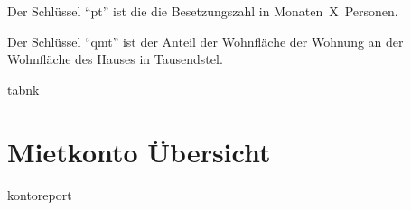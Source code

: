 \documentclass[12pt]{article}
\begin{document}
Der Schlüssel ``pt'' ist die die Besetzungszahl in Monaten\  X\  Personen.

Der Schlüssel ``qmt'' ist der Anteil der Wohnfläche der Wohnung an 
der Wohnfläche des Hauses in Tausendstel.



\bigskip
\bigskip
\bigskip
\bigskip


{
\begin{centering}
{{ tabnk }}
\end{centering}
}

\vfill\eject

\section*{Mietkonto Übersicht}
{\small
\begin{centering}
{{ kontoreport }}
\end{centering}
}
\end{document}
